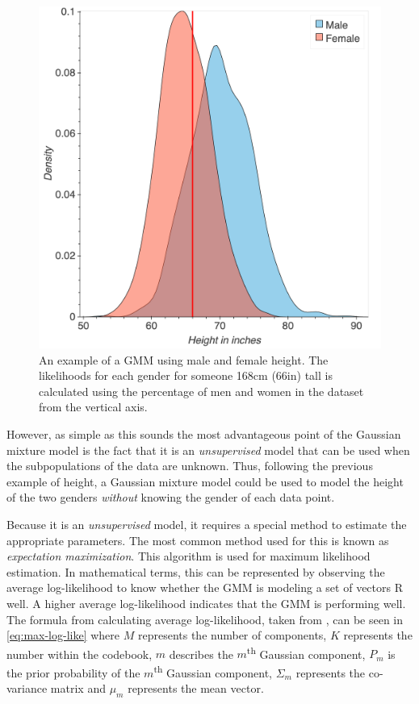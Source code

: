 \documentclass
[
    a4paper,
    twoside,
    12pt,
]
{report}
\begin{document}
\begin{figure}[ht!]
\centering
\includegraphics[scale=0.15]{img/gmm-height.png}
\caption{An example of a GMM using male and female height. The likelihoods for each gender for someone 168cm (66in) tall is calculated using the percentage of men and women in the dataset from the vertical axis.} 
\label{fig:gmm-height}
\end{figure}

However, as simple as this sounds the most advantageous point of the
Gaussian mixture model is the fact that it is an \emph{unsupervised}
model that can be used when the subpopulations of the data are unknown.
Thus, following the previous example of height, a Gaussian mixture model
could be used to model the height of the two genders \emph{without}
knowing the gender of each data point.

Because it is an \emph{unsupervised} model, it requires a special method
to estimate the appropriate parameters. The most common method used for
this is known as \emph{expectation maximization}. This algorithm is used
for maximum likelihood estimation. In mathematical terms, this can be
represented by observing the average log-likelihood to know whether the
GMM is modeling a set of vectors R well. A higher average log-likelihood
indicates that the GMM is performing well. The formula from calculating
average log-likelihood, taken from \textcite{kinnunen2009}, can be seen
in \autoref{eq:max-log-like} where \(M\) represents the number of
components, \(K\) represents the number within the codebook, \(m\)
describes the \(m\)\textsuperscript{th} Gaussian component, \(P_m\) is
the prior probability of the \(m\)\textsuperscript{th} Gaussian
component, \(\Sigma _m\) represents the co-variance matrix and
\(\mu _m\) represents the mean vector.
\end{document}
